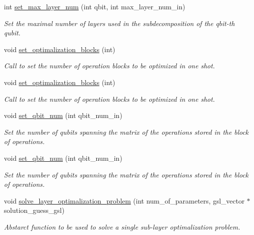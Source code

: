 \begin{DoxyCompactItemize}
int \hyperlink{class_decomposition___base_a6cbee8cd37f42b2fe6bdd6f5c0fd3fdb}{set\+\_\+max\+\_\+layer\+\_\+num} (int qbit, int max\+\_\+layer\+\_\+num\+\_\+in)
\begin{DoxyCompactList}\small\item\em Set the maximal number of layers used in the subdecomposition of the qbit-\/th qubit. \end{DoxyCompactList}\item 
void \hyperlink{class_decomposition___base_af3b3574285055f66f4769f6398a84745}{set\+\_\+optimalization\+\_\+blocks} (int)
\begin{DoxyCompactList}\small\item\em Call to set the number of operation blocks to be optimized in one shot. \end{DoxyCompactList}\item 
void \hyperlink{class_decomposition___base_af3b3574285055f66f4769f6398a84745}{set\+\_\+optimalization\+\_\+blocks} (int)
\begin{DoxyCompactList}\small\item\em Call to set the number of operation blocks to be optimized in one shot. \end{DoxyCompactList}\item 
void \hyperlink{class_operation__block_acc41ac933723558df3f4e65ae1158091}{set\+\_\+qbit\+\_\+num} (int qbit\+\_\+num\+\_\+in)
\begin{DoxyCompactList}\small\item\em Set the number of qubits spanning the matrix of the operations stored in the block of operations. \end{DoxyCompactList}\item 
void \hyperlink{class_operation__block_acc41ac933723558df3f4e65ae1158091}{set\+\_\+qbit\+\_\+num} (int qbit\+\_\+num\+\_\+in)
\begin{DoxyCompactList}\small\item\em Set the number of qubits spanning the matrix of the operations stored in the block of operations. \end{DoxyCompactList}\item 
void \hyperlink{class_two___qubit___decomposition_a78cd2a6470743e5a8b48f5857e440e52}{solve\+\_\+layer\+\_\+optimalization\+\_\+problem} (int num\+\_\+of\+\_\+parameters, gsl\+\_\+vector $\ast$solution\+\_\+guess\+\_\+gsl)
\begin{DoxyCompactList}\small\item\em Abstarct function to be used to solve a single sub-\/layer optimalization problem. \end{DoxyCompactList}\item 

\end{DoxyCompactItemize}
